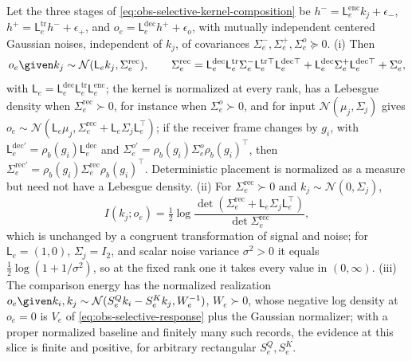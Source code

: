 Let the three stages of \eqref{eq:obs-selective-kernel-composition} be
\(h^-=\mathsf L^{\mathrm{enc}}_ek_j+\epsilon_-\),
\(h^+=\mathsf L^{\mathrm{tr}}_eh^-+\epsilon_+\), and
\(o_e=\mathsf L^{\mathrm{dec}}_eh^++\epsilon_o\), with mutually independent
centered Gaussian noises, independent of \(k_j\), of covariances
\(\Sigma^-_e,\Sigma^+_e,\Sigma^o_e\succeq0\). (i) Then
\begin{equation}
o_e\given k_j\sim\mathcal N(\mathsf L_ek_j,\Sigma^{\mathrm{rec}}_e),
\qquad
\Sigma^{\mathrm{rec}}_e=\mathsf L^{\mathrm{dec}}_e\mathsf L^{\mathrm{tr}}_e\Sigma^-_e\mathsf L_e^{\mathrm{tr}\top}\mathsf L_e^{\mathrm{dec}\top}
+\mathsf L^{\mathrm{dec}}_e\Sigma^+_e\mathsf L_e^{\mathrm{dec}\top}+\Sigma^o_e,
\label{eq:obs-selective-gaussian-record}
\end{equation}
with \(\mathsf L_e=\mathsf L^{\mathrm{dec}}_e\mathsf L^{\mathrm{tr}}_e\mathsf L^{\mathrm{enc}}_e\);
the kernel is normalized at every rank, has a Lebesgue density when
\(\Sigma^{\mathrm{rec}}_e\succ0\), for instance when \(\Sigma^o_e\succ0\), and
for input \(\mathcal N(\mu_j,\Sigma_j)\) gives
\(o_e\sim\mathcal N(\mathsf L_e\mu_j,\Sigma^{\mathrm{rec}}_e+\mathsf L_e\Sigma_j\mathsf L_e^\top)\);
if the receiver frame changes by \(g_i\), with
\(\mathsf L^{\mathrm{dec}\prime}_e=\rho_b(g_i)\mathsf L^{\mathrm{dec}}_e\) and
\(\Sigma^{o\prime}_e=\rho_b(g_i)\Sigma^o_e\rho_b(g_i)^\top\), then
\(\Sigma^{\mathrm{rec}\prime}_e=\rho_b(g_i)\Sigma^{\mathrm{rec}}_e\rho_b(g_i)^\top\).
Deterministic placement is normalized as a measure but need not have a
Lebesgue density. (ii) For \(\Sigma^{\mathrm{rec}}_e\succ0\) and
\(k_j\sim\mathcal N(0,\Sigma_j)\),
\begin{equation}
I(k_j;o_e)=\tfrac12\log
\frac{\det(\Sigma^{\mathrm{rec}}_e+\mathsf L_e\Sigma_j\mathsf L_e^\top)}{\det\Sigma^{\mathrm{rec}}_e},
\label{eq:obs-selective-gaussian-information}
\end{equation}
which is unchanged by a congruent transformation of signal and noise; for
\(\mathsf L_e=(1,0)\), \(\Sigma_j=I_2\), and scalar noise variance
\(\sigma^2>0\) it equals \(\tfrac12\log(1+1/\sigma^2)\), so at the fixed rank
one it takes every value in \((0,\infty)\). (iii) The comparison energy has
the normalized realization
\(o_e\given k_i,k_j\sim\mathcal N(S^Q_ek_i-S^K_ek_j,W_e^{-1})\), \(W_e\succ0\),
whose negative log density at \(o_e=0\) is \(V_e\) of
\eqref{eq:obs-selective-response} plus the Gaussian normalizer; with a proper
normalized baseline and finitely many such records, the evidence at this slice
is finite and positive, for arbitrary rectangular \(S^Q_e,S^K_e\).

